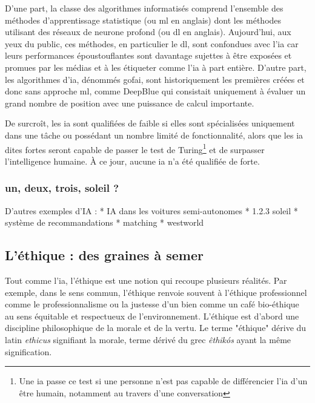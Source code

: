 D'une part, la classe des algorithmes informatisés comprend l'ensemble des méthodes d'apprentissage statistique (ou \gls{ml} en anglais) dont les méthodes utilisant des réseaux de neurone profond (ou \gls{dl} en anglais). Aujourd'hui, aux yeux du public, ces méthodes, en particulier le \gls{dl}, sont confondues avec l'\gls{ia} car leurs performances époustouflantes sont davantage sujettes à être exposées et promues par les médias et à les étiqueter comme l'\gls{ia} à part entière. D'autre part, les algorithmes d'\gls{ia}, dénommés \gls{gofai}, sont historiquement les premières créées et donc sans approche \gls{ml}, comme DeepBlue qui consistait uniquement à évaluer un grand nombre de position avec une puissance de calcul importante.

De surcroît, les \gls{ia} sont qualifiées de faible si elles sont spécialisées uniquement dans une tâche ou possédant un nombre limité de fonctionnalité, alors que les \gls{ia} dites fortes seront capable de passer le test de Turing\footnote{Une \gls{ia} passe ce test si une personne n'est pas capable de différencier l'\gls{ia} d'un être humain, notamment au travers d'une conversation} et de surpasser l'intelligence humaine. À ce jour, aucune \gls{ia} n'a été qualifiée de forte.

\subsubsection{un, deux, trois, soleil ?}


D'autres exemples d'IA :
* IA dans les voitures semi-autonomes
* 1.2.3 soleil
* système de recommandations
* matching
* westworld




\subsection{L'éthique : des graines à semer}\label{subsection:ethique}

Tout comme l'\gls{ia}, l'éthique est une notion qui recoupe plusieurs réalités. Par exemple, dans le sens commun, l'éthique renvoie souvent à l'éthique professionnel comme le professionnalisme ou la justesse d'un bien comme un café bio-éthique au sens équitable et respectueux de l'environnement.
L'éthique est d'abord une discipline philosophique de la morale et de la vertu. Le terme "éthique" dérive du latin \textit{ethicus} signifiant la morale, terme dérivé du grec \textit{êthikós} ayant la même signification.
\cite{ethique-cnil}
\pagebreak

